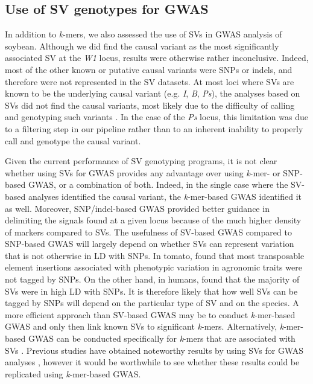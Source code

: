 \subsection*{Use of SV genotypes for GWAS}
\label{use-of-svs-for-gwas}

In addition to \emph{k}-mers, we also assessed the use of SVs in GWAS analysis of soybean.
Although we did find the causal variant as the most significantly associated SV
at the \emph{W1} locus, results were otherwise rather inconclusive.
Indeed, most of the other known or putative causal variants were SNPs or
indels, and therefore were not represented in the SV datasets. At
most loci where SVs are known to be the underlying causal variant (e.g.
\emph{I}, \emph{B}, \emph{Ps}), the analyses based on SVs did not find the causal variants, most likely
due to the difficulty of calling and genotyping such variants
\citep{kosugi2019, lemay2022}. In the case of the \textit{Ps} locus, this limitation
was due to a filtering step in our pipeline rather than to an inherent inability to
properly call and genotype the causal variant.

Given the current performance of SV
genotyping programs, it is not clear whether using SVs for GWAS provides any
advantage over using \emph{k}-mer- or SNP-based GWAS, or a combination of both.
Indeed, in the single case where the SV-based analyses identified the causal
variant, the \emph{k}-mer-based GWAS identified it as well. Moreover,
SNP/indel-based GWAS provided better guidance in delimiting the signals found
at a given locus because of the much higher density of markers compared to SVs.
The usefulness of SV-based GWAS compared to SNP-based
GWAS will largely depend on whether SVs can represent variation that is not
otherwise in LD with SNPs. In tomato, \cite{dominguez2020} found that most
transposable element insertions associated with phenotypic variation in
agronomic traits were not tagged by SNPs. On the other hand, in humans,
\cite{maretty2017} found that the majority of SVs were in high LD with SNPs. It
is therefore likely that how well SVs can be tagged by SNPs will depend on
the particular type of SV and on the species. A more
efficient approach than SV-based GWAS may be to conduct \emph{k}-mer-based GWAS
and only then link known SVs to significant \emph{k}-mers.
Alternatively, \textit{k}-mer-based GWAS can be conducted specifically for
\textit{k}-mers that are associated with SVs \citep{jayakodi2020}.
Previous studies have
obtained noteworthy results by using SVs for GWAS analyses \citep[e.g.][]{zhang2015, akakpo2020,
dominguez2020}, however it would be worthwhile to see whether these results
could be replicated using \emph{k}-mer-based GWAS.

